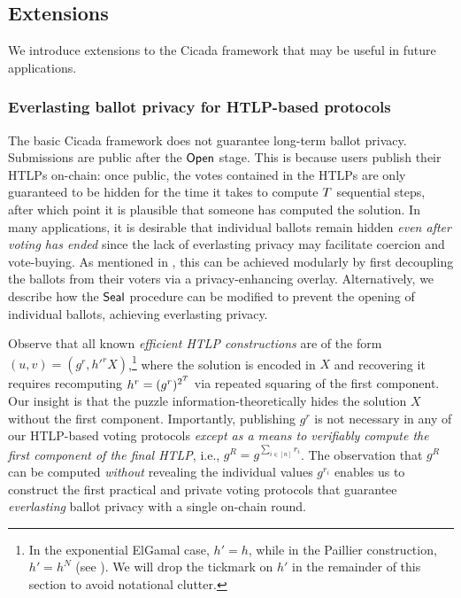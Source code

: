 \subsection{Extensions}\label{sec:cicada_extensions}
We introduce extensions to the Cicada framework that may be useful in future applications.

\subsubsection{Everlasting ballot privacy for HTLP-based protocols}\label{sec:everlasting_ballot_privacy}




The basic Cicada framework does not guarantee long-term ballot privacy. Submissions are public after the $\mathsf{Open}$ stage. This is because users publish their HTLPs on-chain: once public, the votes contained in the HTLPs are only guaranteed to be hidden for the time it takes to compute $T$ sequential steps, after which point it is plausible that someone has computed the solution. In many applications, it is desirable that individual ballots remain hidden \emph{even after voting has ended} since the lack of everlasting privacy may facilitate coercion and vote-buying. As mentioned in , this can be achieved modularly by first decoupling the ballots from their voters via a privacy-enhancing overlay. Alternatively, we describe how the $\mathsf{Seal}$ procedure can be modified to prevent the opening of individual ballots, achieving everlasting privacy.

Observe that all known \emph{efficient HTLP constructions} are of the form $(u,v) = (g^r, {h'}^r X)$,\footnote{In the exponential ElGamal case, $h' = h$, while in the Paillier construction, $h' = h^N$ (see ). We will drop the tickmark on $h'$ in the remainder of this section to avoid notational clutter.} where the solution is encoded in $X$ and recovering it requires recomputing $h^r=(g^{r})^{2^{T}}$ via repeated squaring of the first component. Our insight is that the puzzle information-theoretically hides the solution $X$ without the first component. Importantly, publishing $g^r$ is not necessary in any of our HTLP-based voting protocols \emph{except as a means to verifiably compute the first component of the final HTLP}, i.e., $g^{R}=g^{\sum_{i\in[n]} r_i}$. The observation that $g^R$ can be computed \emph{without} revealing the individual values $g^{r_i}$ enables us to construct the first practical and private voting protocols that guarantee \emph{everlasting} ballot privacy with a single on-chain round.


